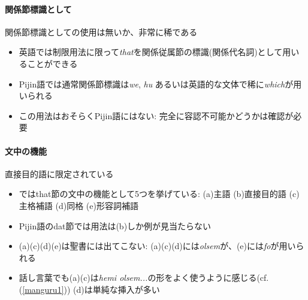 \documentclass[11pt,a4paper]{jsarticle}
\begin{document}
\paragraph{関係節標識として} 関係節標識としての使用は無いか、非常に稀である
\begin{itemize}
  \item 英語では制限用法に限って\textit{that}を関係従属節の標識(関係代名詞)として用いることができる\citep[365-367]{english}
  \item Pijin語では通常関係節標識は\textit{we}, \textit{hu} あるいは英語的な文体で稀に\textit{which}が用いられる
  \item この用法はおそらくPijin語にはない: 完全に容認不可能かどうかは確認が必要
\end{itemize}
\paragraph{文中の機能} 直接目的語に限定されている
\begin{itemize}
  \item \cite[1049]{english}ではthat節の文中の機能として5つを挙げている: (a)主語 (b)直接目的語 (c)主格補語 (d)同格 (e)形容詞補語
  \item Pijin語のdat節では用法は(b)しか例が見当たらない
  \item (a)(c)(d)(e)は聖書には出てこない: (a)(c)(d)には\textit{olsem}が、(e)には\textit{fo}が用いられる
  \item 話し言葉でも(a)(c)は\textit{hemi olsem...}の形をよく使うように感じる(cf. (\ref{manguru1})) (d)は単純な挿入が多い
\end{itemize}
\end{document}
